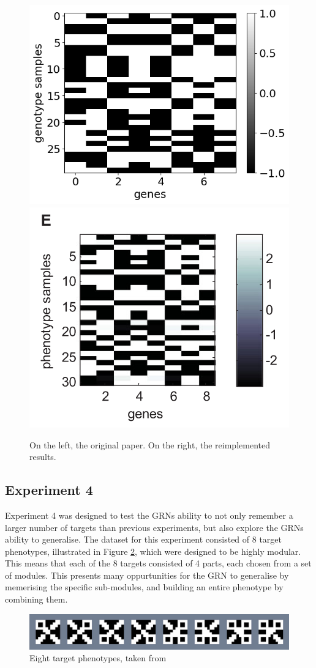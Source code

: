 \documentclass[twocolumn,a4paper,11pt]{article}
\begin{document}
    \begin{figure}[h]
        \centering
        \includegraphics[width=0.45\linewidth]{img/fig2e.png}
        \includegraphics[width=0.45\linewidth]{orig_img/fig2e.png}
        \caption{On the left, the original paper. On the right, the reimplemented results.} \label{fig:2e}
    \end{figure}

    \subsection{Experiment 4}
    Experiment 4 was designed to test the GRNs ability to not only remember a larger number of targets than previous experiments, but also explore the GRNs ability to generalise. The dataset for this experiment consisted of 8 target phenotypes, illustrated in Figure \ref{fig:4-targets}, which were designed to be highly modular. This means that each of the 8 targets consisted of 4 parts, each chosen from a set of modules. This presents many oppurtunities for the GRN to generalise by memerising the specific sub-modules, and building an entire phenotype by combining them.

    \begin{figure}[h]
        \centering
        \includegraphics[width=0.7\linewidth]{orig_img/ex4_targets.png}
        \caption{Eight target phenotypes, taken from \cite{original-paper}} \label{fig:4-targets}
    \end{figure}
\end{document}
